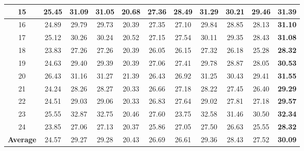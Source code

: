 \begin{table}
\begin{center}
\begin{tabular}{|c||c|c|c|c|c|c|c|c|c|c|}
\\
\hline
15& 25.45 & 31.09 & 31.05 & 20.68 & 27.36 & 28.49 & 31.29 & 30.21 & 29.46 & \textbf{31.39}
\\
\hline
16& 24.89 & 29.79 & 29.73 & 20.39 & 27.35 & 27.10 & 29.84 & 28.85 & 28.13 & \textbf{31.10}
\\
\hline
17& 25.12 & 30.26 & 30.24 & 20.52 & 27.15 & 27.54 & 30.11 & 29.35 & 28.43 & \textbf{31.08}
\\
\hline
18& 23.83 & 27.26 & 27.26 & 20.39 & 26.05 & 26.15 & 27.32 & 26.18 & 25.28 & \textbf{28.32}
\\
\hline
19& 24.63 & 29.40 & 29.39 & 20.39 & 27.06 & 27.41 & 29.78 & 28.87 & 28.05 & \textbf{30.53}
\\
\hline
20& 26.43 & 31.16 & 31.27 & 21.39 & 26.43 & 26.92 & 31.25 & 30.43 & 29.41 & \textbf{31.55}
\\
\hline
21& 24.24 & 28.26 & 28.27 & 20.33 & 26.66 & 27.18 & 28.22 & 27.45 & 26.40 & \textbf{29.29}
\\
\hline
22& 24.51 & 29.03 & 29.06 & 20.33 & 26.83 & 27.64 & 29.02 & 27.81 & 27.18 & \textbf{29.57}
\\
\hline
23& 25.55 & 32.87 & 32.75 & 20.46 & 27.60 & 23.75 & 32.58 & 31.46 & 30.50 & \textbf{32.34}
\\
\hline
24& 23.85 & 27.06 & 27.13 & 20.37 & 25.86 & 27.05 & 27.50 & 26.63 & 25.55 & \textbf{28.32}
\\
\hline
\textbf{Average}
& 24.57 & 29.27 & 29.28 & 20.43 & 26.69 & 26.61 & 29.36 & 28.43 & 27.52 & \textbf{30.09}
\\
\hline
\end{tabular}
\end{center}
\end{table}


